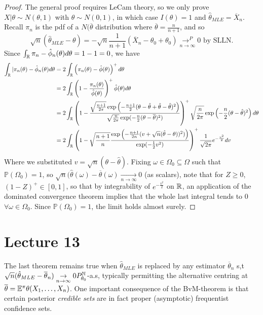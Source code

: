 \documentclass[a4paper]{article}
\begin{document}
\begin{proof}
	The general proof requires LeCam theory, so we only prove $X|\theta \sim N(\theta, 1)$ with  $\theta \sim N(0,1)$, in which case $I(\theta) = 1$ and $\hat{\theta}_{MLE} = \overline{X}_{n}$. Recall $\pi_n$ is the pdf of a $N(\overline{\theta}$ distribution where $ \overline{\theta} = \frac{n}{n+1}$, and so
	\[
		\sqrt{n} (\hat{\theta}_{MLE} - \theta) = - \sqrt{n} \frac{1}{n+1} (\overline{X}_n - \theta_0 + \theta_0) \underset{n\to \infty}{\to ^{P}} 0 \text{ by SLLN.}
	\] 
	Since $\int_{\mathbb{R}} \pi_n - \hat{\phi}_n(\theta) d\theta = 1-1 = 0$, we have 
	\begin{align*}
		\int_{\mathbb{R}} |\pi_n (\theta) - \hat{\phi}_n(\theta) d\theta &= 2\int_{\mathbb{R}} \left( \pi_n(\theta) - \hat{\phi}(\theta) \right)^{+} d\theta  \\
		&= 2\int_{\mathbb{R}} \left( 1 - \frac{\pi_n(\theta)}{\hat{\phi}(\theta)} \right) ^{+} \hat{\phi}(\theta) d\theta \\
		&= 2\int_{\mathbb{R}} \left( 1 - \frac{\sqrt{\frac{n+1}{2\pi}} \exp\left(-\frac{n+1}{2}(\theta - \hat{\theta} + \hat{\theta} - \hat{\theta})^2\right) }{\sqrt{\frac{n}{2\pi}} \exp(-\frac{n}{2}(\theta - \overline{\theta})^2) } \right)^{+} \sqrt{\frac{n}{2\pi}} \exp\left( -\frac{n}{2}(\theta - \hat{\theta})^2 \right) d\theta  \\
		&= 2\int_{\mathbb{R}} \left( 1 - \sqrt{\frac{n+1}{n}} \frac{\exp\left( - \frac{n+1}{2n} (v + \sqrt{n} (\hat{\theta} - \theta))^2) \right) }{\exp(-\frac{1}{2}v^2) } \right)^{+} \frac{1}{\sqrt{2\pi} } e^{-\frac{v^2}{2}} dv
	\end{align*}
	Where we substituted $v = \sqrt{n} (\theta - \hat{\theta})$. Fixing  $\omega \in \Omega_0 \subseteq \Omega$ such that $\mathbb{P}\left( \Omega_0 \right) = 1$, so $\sqrt{n} (\hat{\theta}(\omega) - \overline{\theta}(\omega) \underset{n\to \infty}{\to } 0 $ (as scalars), note that for $Z\ge 0$, $(1-Z)^{+} \in [0,1]$, so that by integrability of $e^{-\frac{v^2}{2}}$ on $\mathbb{R}$, an application of the dominated convergence theorem implies that the whole last integral tends to $0$ $\forall \omega \in \Omega_0$. Since $\mathbb{P}\left( \Omega_0 \right) = 1$, the limit holds almost surely.
\end{proof}

\section*{Lecture 13}

The last theorem remains true when $\hat{\theta}_{MLE}$ is replaced by any estimator $\overline{\theta}_n$ s,t $\sqrt{n} (\hat{\theta}_{MLE} - \overline{\theta}_n) \underset{n\to \infty}{\to } 0 P_{\theta_0}^{\mathbb{N}}$-a.s, typically permitting the alternative centring at $\overline{\theta} = \mathbb{E}^{\pi} \theta(X_1, \ldots, X_n)$. One important consequence of the BvM-theorem is that certain posterior \textit{credible sets} are in fact proper (asymptotic) frequentist confidence sets.
\end{document}
